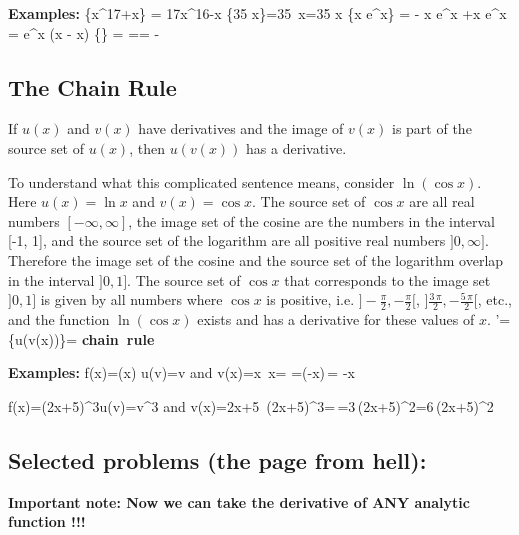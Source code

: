 {\bf Examples:}
\bnn {}\{x^{17}+\cos x\} = 17x^{16}-\sin x \enn
\bnn {}\{35 \cosh x\}=35 \,\cosh x=35 \sinh x \enn
\bnn {}\{\cos x e^x\} = - \sin x e^x +\cos x e^x = e^x (\cos x - \sin x) \enn
\bnn {}\{\} = 
    == - \enn \svs


\subsection{The Chain Rule}
If $u(x)$ and $v(x)$ have derivatives and the image of $v(x)$ is part of the source set of $u(x)$, 
then $u(v(x))$ has a derivative. 

To understand what this complicated sentence means, consider 
$\ln(\cos x)$. Here $u(x)=\ln x$ and $v(x)=\cos x$. The source set of $\cos x$ are all real numbers
$[-\infty, \infty]$, the image set of the cosine are the numbers in the interval [-1, 1], and the source 
set of the logarithm are all positive real numbers $]0, \infty]$. Therefore the image set of the cosine 
and the source set of the logarithm overlap in the interval $]0, 1]$. The source set of $\cos x$ that corresponds
to the image set $]0, 1]$ is given by all numbers where $\cos x$ is positive, i.e. $]-\frac{\pi}{2}, -\frac{\pi}{2}[$,
$]\frac{3\,\pi}{2}, -\frac{5\,\pi}{2}[$, etc., and the function $\ln(\cos x)$ exists and has a derivative for 
these values of $x$.
\bnn [u(v(x))]'=\{u(v(x))\}= \; \qquad\qquad \mbox{\bf chain rule} \enn

{\bf Examples:}
\bnn f(x)=\cos(\alpha x) \quad \rightarrow \quad u(v)=\cos v \quad \mbox{and} \quad v(x)=\alpha x \enn
\bnn {}\,\cos \alpha x=\;
   =(-\sin \alpha x)\,\alpha = -\alpha \sin \alpha x \enn

\bnn f(x)=(2x+5)^3\quad \rightarrow \quad u(v)=v^3 \quad \mbox{and} \quad v(x)=2x+5 \enn
\bnn {}\,(2x+5)^3=\,=3\,(2x+5)^2=6\,(2x+5)^2 \enn

\subsection{Selected problems (the page from hell):}
{\bf Important note: Now we can take the derivative of ANY analytic function !!!}

